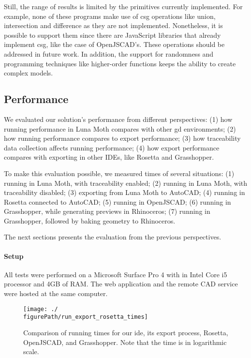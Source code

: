 Still, the range of results is limited by the primitives currently implemented.
For example, none of these programs make use of \gls{csg} operations like union, intersection and difference as they are not implemented.
Nonetheless, it is possible to support them since there are JavaScript libraries that already implement \gls{csg}, like the case of OpenJSCAD's.
These operations should be addressed in future work.
In addition, the support for randomness and programming techniques like higher-order functions keeps the ability to create complex models.


\subsection{Performance}
We evaluated our solution's performance from different perspectives:
(1) how running performance in Luna Moth compares with other \gls{gd} environments;
(2) how running performance compares to export performance;
(3) how traceability data collection affects running performance;
(4) how export performance compares with exporting in other IDEs, like Rosetta and Grasshopper.

To make this evaluation possible, we measured times of several situations:
(1) running in Luna Moth, with traceability enabled;
(2) running in Luna Moth, with traceability disabled;
(3) exporting from Luna Moth to AutoCAD;
(4) running in Rosetta connected to AutoCAD;
(5) running in OpenJSCAD;
(6) running in Grasshopper, while generating previews in Rhinoceros;
(7) running in Grasshopper, followed by baking geometry to Rhinoceros.

The next sections presents the evaluation from the previous perspectives.

\paragraph{Setup}
All tests were performed on a Microsoft Surface Pro 4 with in Intel Core i5 processor and 4GB of RAM.
The web application and the remote CAD service were hosted at the same computer.

\begin{figure}
  \centering
  \texttt{[image: ./\\figurePath/run\_export\_rosetta\_times]}
  \caption[Comparison of running times for our \gls{ide}, its export process, Rosetta, OpenJSCAD, and Grasshopper.]{Comparison of running times for our \gls{ide}, its export process, Rosetta, OpenJSCAD, and Grasshopper. Note that the time is in logarithmic scale.}
  \label{fig:run:export:rosetta:chart}
\end{figure}


